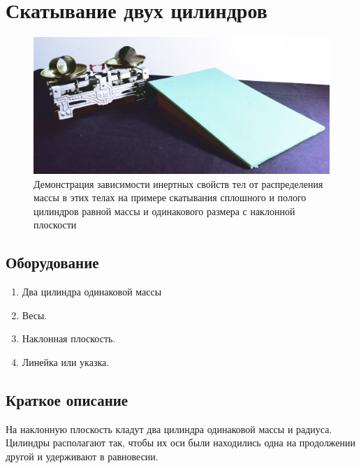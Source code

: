 \documentclass[All.tex]{subfiles}
\begin{document}
	
	

		\section{Скатывание двух цилиндров}

		

\begin{figure}[H] 	
	\centering 	
	\includegraphics[width=0.9\linewidth]{inclinedplane-1.png}
	\caption{Демонстрация зависимости инертных свойств тел от распределения массы в этих телах на примере скатывания сплошного и полого цилиндров равной массы и одинакового размера с наклонной плоскости}
	\label{inclinedplane-1}
\end{figure}
	
	\subsection*{\textcolor{PineGreen}{Оборудование}}

		\begin{enumerate}
			\item Два цилиндра одинаковой массы
			\item Весы.
			\item Наклонная плоскость.
			\item Линейка или указка.
		\end{enumerate}
		
	\subsection*{\textcolor{PineGreen}{Краткое описание}}
		
	На наклонную плоскость кладут два цилиндра одинаковой массы и радиуса.
	Цилиндры располагают так, чтобы их оси были находились одна на продолжении другой и удерживают в равновесии.
	
\end{document}
